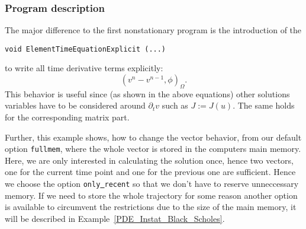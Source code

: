 \subsubsection{Program description}

The major difference to the first nonstationary program
is the introduction of the 
\begin{verbatim}
void ElementTimeEquationExplicit (...) 
\end{verbatim}
to write all time derivative terms explicitly:
\begin{equation*}
(v^n - v^{n-1}, \phi)_{\Omega}.
\end{equation*}
This behavior is useful since (as shown in the above equations)
other solutions variables have to be considered
around $\partial_t v$ such as $J:=J(u)$. 
The same holds for the corresponding matrix part.

Further, this example shows, how to change the vector behavior, from 
our default option \texttt{fullmem}, where the whole vector is stored in 
the computers main memory. Here, we are only interested in calculating the 
solution once, hence two vectors, one for the current time point and one for the
previous one are sufficient. Hence we choose the option 
\texttt{only\underline{ }recent} so that we don't have to reserve unneccessary memory.
If we need to store the whole trajectory for some reason another option is available 
to circumvent the restrictions due to the size of the main memory, it will be 
described in Example~\ref{PDE_Instat_Black_Scholes}.

\vspace{0.2cm}
